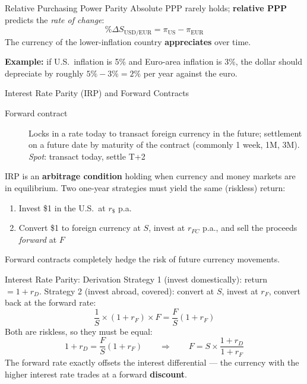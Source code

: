 \documentclass[aspectratio=169]{beamer}
\begin{document}
\begin{frame}{Relative Purchasing Power Parity}
Absolute PPP rarely holds; \textbf{relative PPP} predicts the \emph{rate of change}:
\[
\%\Delta S_{\text{USD/EUR}} = \pi_{\text{US}} - \pi_{\text{EUR}}
\]
The currency of the lower-inflation country \textbf{appreciates} over time.
\vspace{0.3em}

\textbf{Example:} if U.S.\ inflation is 5\% and Euro-area inflation is 3\%, the dollar should depreciate by roughly $5\%-3\% = 2\%$ per year against the euro.
\end{frame}

\begin{frame}{Interest Rate Parity (IRP) and Forward Contracts}
\begin{description}
  \item[Forward contract] Locks in a rate today to transact foreign currency in the future; settlement on a future date by maturity of the contract (commonly 1 week, 1M, 3M). \emph{Spot}: transact today, settle T+2
\end{description}
\vspace{0.2em}
IRP is an \textbf{arbitrage condition} holding when currency and money markets are in equilibrium. Two one-year strategies must yield the same (riskless) return:
\begin{enumerate}
  \item Invest \$1 in the U.S.\ at $r_{\$}$ p.a.
  \item Convert \$1 to foreign currency at $S$, invest at $r_{FC}$ p.a., and sell the proceeds \emph{forward} at $F$
\end{enumerate}
Forward contracts completely hedge the risk of future currency movements.
\end{frame}

\begin{frame}{Interest Rate Parity: Derivation}
Strategy 1 (invest domestically): return $= 1 + r_D$.
\vspace{0.2em}
Strategy 2 (invest abroad, covered): convert at $S$, invest at $r_F$, convert back at the forward rate:
\[
\frac{1}{S}\times(1+r_F)\times F = \frac{F}{S}(1+r_F)
\]
Both are riskless, so they must be equal:
\[
1 + r_D = \frac{F}{S}(1+r_F)
\qquad\Longrightarrow\qquad
F = S \times \frac{1+r_D}{1+r_F}
\]
The forward rate exactly offsets the interest differential --- the currency with the higher interest rate trades at a forward \textbf{discount}.
\end{frame}
\end{document}
